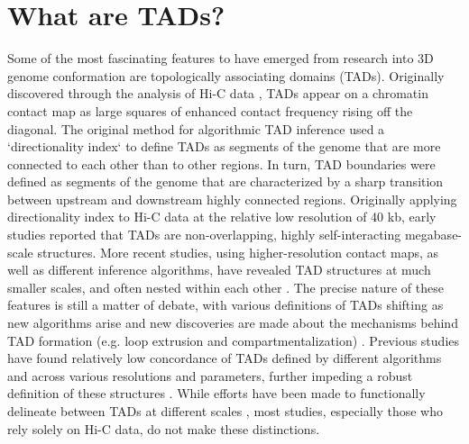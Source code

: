 \section{What are TADs?}
Some of the most fascinating features to have emerged from research into 3D genome conformation are topologically associating domains (TADs). Originally discovered through the analysis of Hi-C data \cite{Dixon.2012, Nora.2012, Hou.2012, Sexton.2012}, TADs appear on a chromatin contact map as large squares of enhanced contact frequency rising off the diagonal. The original method for algorithmic TAD inference used a `directionality index` \cite{Dixon.2012} to define TADs as segments of the genome that are more connected to each other than to other regions.  In turn, TAD boundaries were defined as segments of the genome that are characterized by a sharp transition between upstream and downstream highly connected regions. Originally applying directionality index to Hi-C data at the relative low resolution of 40 kb, early studies reported that TADs are non-overlapping, highly self-interacting megabase-scale structures. More recent studies, using higher-resolution contact maps, as well as different inference algorithms, have revealed TAD structures at much smaller scales, and often nested within each other \cite{Phiillips-Cremins.2013, Berlivet.2013, Rao.2014}. The precise nature of these features is still a matter of debate, with various definitions of TADs shifting as new algorithms arise and new discoveries are made about the mechanisms behind TAD formation (e.g. loop extrusion and compartmentalization) \cite{Phiillips-Cremins.2013, Rao.2014, Filippova.2014, Dixon.2016, Zhan.2017, Nuebler.2018, Fudenberg.2016, Sanborn.2015}. Previous studies have found relatively low concordance of TADs defined by different algorithms and across various resolutions and parameters, further impeding a robust definition of these structures \cite{Dali.2017, Forcato.2017, Zufferey.2018}. While efforts have been made to functionally delineate between TADs at different scales \cite{Dixon.2016, Beagan.2020, Sikorska.2019, Szabo.2019}, most studies, especially those who rely solely on Hi-C data, do not make these distinctions.


